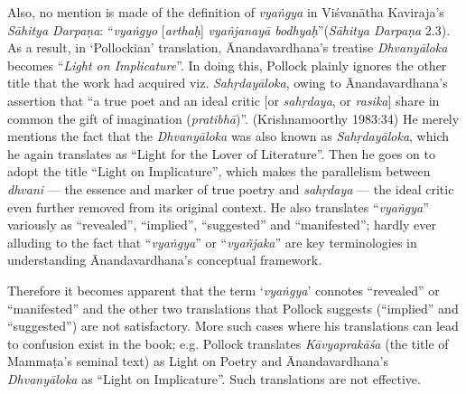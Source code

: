 Also, no mention is made of the definition of \textsl{vyaṅgya} in Viśvanātha Kaviraja’s \textsl{Sāhitya Darpaṇa}: “\textsl{vyaṅgyo} [\textsl{arthaḥ}] \textsl{vyañjanayā bodhyaḥ}”\break (\textsl{Sāhitya Darpaṇa} 2.3). As a result, in ‘Pollockian’ translation, Ānandavardhana’s treatise \textsl{Dhvanyāloka} becomes “\textsl{Light on Implicature}”. In doing this, Pollock plainly ignores the other title that the work had acquired viz. \textsl{Sahṛdayāloka}, owing to Ānandavardhana’s assertion that “a true poet and an ideal critic [or \textsl{sahṛdaya}, or \textsl{rasika}] share in common the gift of imagination (\textsl{pratibhā})”. (Krishnamoorthy 1983:34) He merely mentions the fact that the \textsl{Dhvanyāloka} was also known as \textsl{Sahṛdayāloka}, which he again translates as “Light for the Lover of Literature”. Then he goes on to adopt the title “Light on Implicature”, which makes the parallelism between \textsl{dhvani} --- the essence and marker of true poetry and \textsl{sahṛdaya} --- the ideal critic even further removed from its original context. He also translates “\textsl{vyaṅgya}” variously as “revealed”, “implied”, “suggested” and “manifested”; hardly ever alluding to the fact that “\textsl{vyaṅgya}” or “\textsl{vyañjaka}” are key terminologies in understanding Ānandavardhana’s conceptual framework.

Therefore it becomes apparent that the term ‘\textsl{vyaṅgya}’ connotes “revealed” or “manifested” and the other two translations that Pollock suggests (“implied” and “suggested”) are not satisfactory. More such cases where his translations can lead to confusion exist in the book; e.g. Pollock translates \textsl{Kāvyaprakāśa} (the title of Mammaṭa’s seminal text) as Light on Poetry and Ānandavardhana’s \textsl{Dhvanyāloka} as “Light on Implicature”. Such translations are not effective.

